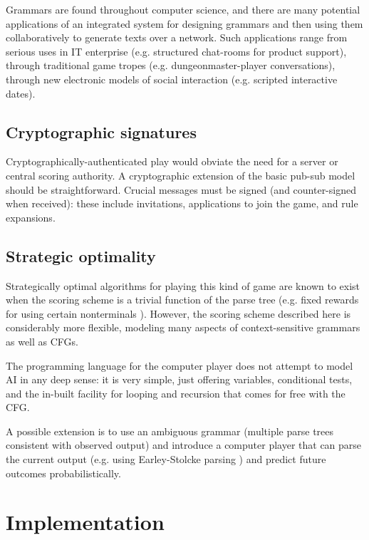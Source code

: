 \documentclass{acm_proc_article-sp}
\begin{document}
Grammars are found throughout computer science,
and there are many potential applications of an
integrated system for designing grammars and then using them collaboratively to generate texts over a network.
Such applications range from
serious uses in IT enterprise (e.g. structured chat-rooms for product support),
through traditional game tropes (e.g. dungeonmaster-player conversations),
through new electronic models of social interaction (e.g. scripted interactive dates).


\subsection{Cryptographic signatures}

Cryptographically-authenticated play would obviate the need for a server or central scoring authority.
A cryptographic extension of the basic pub-sub model should be straightforward.
Crucial messages must be signed (and counter-signed when received):
these include invitations, applications to join the game, and rule expansions.

\subsection{Strategic optimality}

Strategically optimal algorithms for playing this kind of game are known to exist when the scoring scheme is a trivial function of the parse tree (e.g. fixed rewards for using certain nonterminals \cite{DBLP:conf/icalp/EtessamiWY08}).
However, the scoring scheme described here is considerably more flexible, modeling many aspects of context-sensitive grammars as well as CFGs.

The programming language for the computer player does not attempt to model AI in any deep sense:
it is very simple, just offering variables, conditional tests, and the in-built facility for looping and recursion that comes for free with the CFG.

A possible extension is to use an ambiguous grammar (multiple parse trees consistent with observed output)
and introduce a computer player that can parse the current output
(e.g. using Earley-Stolcke parsing \cite{Stolcke:1995:EPC:211190.211197})
and predict future outcomes probabilistically.

\section{Implementation}
\end{document}
